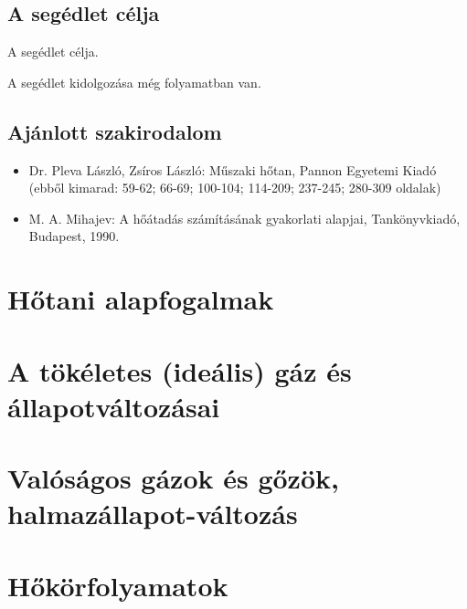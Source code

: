 \documentclass[11pt, a4paper]{report}
\begin{document}
\section*{A segédlet célja}

A segédlet célja.

A segédlet kidolgozása még folyamatban van.


\section*{Ajánlott szakirodalom}

\begin{itemize}
	\item Dr. Pleva László, Zsíros László: Műszaki hőtan, Pannon Egyetemi Kiadó (ebből kimarad: 59-62; 66-69; 100-104; 114-209; 237-245; 280-309 oldalak)
	\item M. A. Mihajev: A hőátadás számításának gyakorlati alapjai, Tankönyvkiadó, Budapest, 1990.
\end{itemize}


\chapter{Hőtani alapfogalmak}






\chapter{A tökéletes (ideális) gáz és állapotváltozásai}















\chapter{Valóságos gázok és gőzök, halmazállapot-változás}





\chapter{Hőkörfolyamatok}
\end{document}
